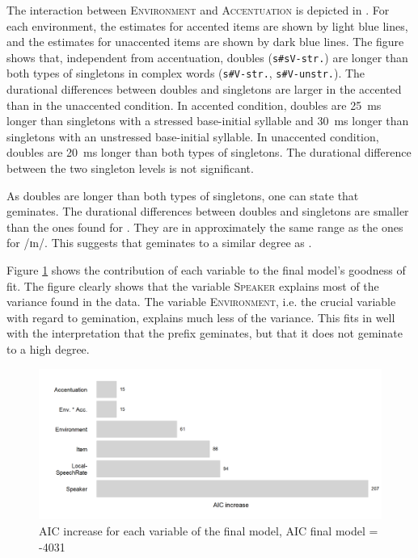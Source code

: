 The interaction between \textsc{Environment} and \textsc{Accentuation} is depicted in . For each environment, the estimates for accented items are shown by light blue lines, and the estimates for unaccented items are shown by dark blue lines.
The figure shows that,  
independent from accentuation, doubles (\texttt{s\#sV-str.}) are longer than both types of singletons in complex words (\texttt{s\#V-str.}, \texttt{s\#V-unstr.}). The durational differences between doubles and singletons are larger in the accented than in the unaccented condition. 
In accented condition, doubles are 25~ms longer than singletons with a stressed base-initial syllable and 30~ms longer than singletons with an unstressed base-initial syllable. 
In unaccented condition, doubles are 20~ms longer than both types of singletons. 
The durational difference between the two singleton levels is not significant.

As doubles are longer than both types of singletons, one can state that  geminates. The durational differences between doubles and singletons are smaller than the ones found for . They are in approximately the same range as the ones for /ɪn/. This suggests that  geminates to a similar degree as .



Figure \ref{fig:Effectsize dis experiment} shows the contribution of each variable to the final model's goodness of fit.
The figure clearly shows that the variable \textsc{Speaker} explains most of the variance found in the data. The variable 
\textsc{Environment}, i.e. the crucial variable with regard to gemination, explains much less of the variance. This fits in well with the interpretation that the prefix  geminates, but that it does not geminate to a high degree.


\begin{figure}[h!]
	\centering
	\includegraphics[scale=0.7]{images/Experiment/AICdecreaseDisComplex.png}
	\caption{AIC increase for each variable of the final model, AIC final model = -4031}
	\label{fig:Effectsize dis experiment}

\end{figure}




